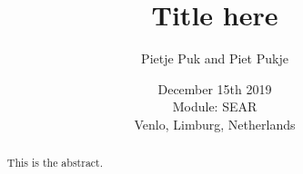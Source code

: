 \documentclass[]{report}
\title{Title here}
\author{Pietje Puk and Piet Pukje}
\date{December 15th 2019 \\Module: SEAR \\Venlo, Limburg, Netherlands}
\begin{document}
\maketitle

\begin{abstract}
This is the abstract.
\end{abstract}

\tableofcontents
\setcounter{page}{3}
\pagebreak
{}	
	
 
 
\end{document}
